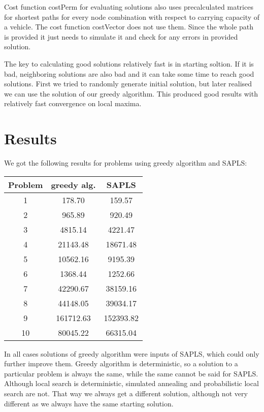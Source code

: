 \documentclass[a4paper, 12pt]{article}
\begin{document}
Cost function {\sf costPerm} for evaluating solutions also uses
precalculated matrices for shortest paths for every node combination with
respect to carrying capacity of a vehicle. The cost function {\sf costVector}
does not use them. Since the whole path is provided it just needs to simulate
it and check for any errors in provided solution.

The key to calculating good solutions relatively fast is in starting soltion.
If it is bad, neighboring solutions are also bad and it can take some time to
reach good solutions. First we tried to randomly generate initial solution, but
later realised we can use the solution of our greedy algorithm. This produced
good results with relatively fast convergence on local maxima.

\section{Results}

We got the following results for problems using greedy algorithm and SAPLS:
\begin{center}
\begin{tabular}{ c|cc }
	Problem & greedy alg. & SAPLS \\
	\hline
	1 & 178.70 & 159.57 \\
	2 & 965.89 & 920.49 \\
	3 & 4815.14 & 4221.47 \\
	4 & 21143.48 & 18671.48 \\
	5 & 10562.16 & 9195.39 \\
	6 & 1368.44 & 1252.66 \\
	7 & 42290.67 & 38159.16 \\
	8 & 44148.05 & 39034.17 \\
	9 & 161712.63 & 152393.82 \\
	10 & 80045.22 & 66315.04 \\
\end{tabular}
\end{center}

In all cases solutions of greedy algorithm were inputs of SAPLS, which could
only further improve them. Greedy algorithm is deterministic, so a solution to
a particular problem is always the same, while the same cannot be said for SAPLS.
Although local search is deterministic, simulated annealing and probabilistic
local search are not. That way we always get a different solution, although not
very different as we always have the same starting solution.
\end{document}
